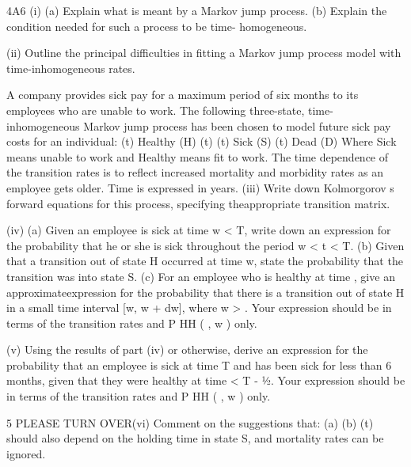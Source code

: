 \documentclass[a4paper,12pt]{article}
\begin{document}
\begin{enumerate}

 4A6
(i)
(a) Explain what is meant by a Markov jump process.
(b) Explain the condition needed for such a process to be time-
homogeneous.

(ii)
Outline the principal difficulties in fitting a Markov jump process model with
time-inhomogeneous rates.

A company provides sick pay for a maximum period of six months to its employees
who are unable to work. The following three-state, time-inhomogeneous Markov
jump process has been chosen to model future sick pay costs for an individual:
(t)
Healthy
(H)
(t)
(t)
Sick
(S)
(t)
Dead
(D)
Where Sick means unable to work and Healthy means fit to work.
The time dependence of the transition rates is to reflect increased mortality and morbidity rates as an employee gets older. Time is expressed in years.
(iii) Write down Kolmorgorov s forward equations for this process, specifying theappropriate transition matrix.

(iv) (a)
Given an employee is sick at time w < T, write down an expression for the probability that he or she is sick throughout the period w < t < T.
(b)
Given that a transition out of state H occurred at time w, state the probability that the transition was into state S.
(c)
For an employee who is healthy at time , give an approximateexpression for the probability that there is a transition out of state H in
a small time interval [w, w + dw], where w > . Your expression should be in terms of the transition rates and P HH ( , w ) only.

(v)
Using the results of part (iv) or otherwise, derive an expression for the probability that an employee is sick at time T and has been sick for less than 6 months, given that they were healthy at time < T - 1⁄2. Your expression should be in terms of the transition rates and P HH ( , w ) only.


 5
PLEASE TURN OVER(vi)
Comment on the suggestions that:
(a)
(b)
(t) should also depend on the holding time in state S, and
mortality rates can be ignored.


\end{enumerate}
\end{document}
